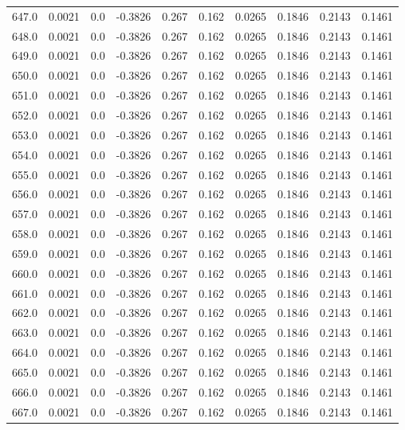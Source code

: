 \begin{longtable}{lrrrrrrrrr}
647.0 & 0.0021 & 0.0 & -0.3826 & 0.267 & 0.162 & 0.0265 & 0.1846 & 0.2143 & 0.1461 \\
648.0 & 0.0021 & 0.0 & -0.3826 & 0.267 & 0.162 & 0.0265 & 0.1846 & 0.2143 & 0.1461 \\
649.0 & 0.0021 & 0.0 & -0.3826 & 0.267 & 0.162 & 0.0265 & 0.1846 & 0.2143 & 0.1461 \\
650.0 & 0.0021 & 0.0 & -0.3826 & 0.267 & 0.162 & 0.0265 & 0.1846 & 0.2143 & 0.1461 \\
651.0 & 0.0021 & 0.0 & -0.3826 & 0.267 & 0.162 & 0.0265 & 0.1846 & 0.2143 & 0.1461 \\
652.0 & 0.0021 & 0.0 & -0.3826 & 0.267 & 0.162 & 0.0265 & 0.1846 & 0.2143 & 0.1461 \\
653.0 & 0.0021 & 0.0 & -0.3826 & 0.267 & 0.162 & 0.0265 & 0.1846 & 0.2143 & 0.1461 \\
654.0 & 0.0021 & 0.0 & -0.3826 & 0.267 & 0.162 & 0.0265 & 0.1846 & 0.2143 & 0.1461 \\
655.0 & 0.0021 & 0.0 & -0.3826 & 0.267 & 0.162 & 0.0265 & 0.1846 & 0.2143 & 0.1461 \\
656.0 & 0.0021 & 0.0 & -0.3826 & 0.267 & 0.162 & 0.0265 & 0.1846 & 0.2143 & 0.1461 \\
657.0 & 0.0021 & 0.0 & -0.3826 & 0.267 & 0.162 & 0.0265 & 0.1846 & 0.2143 & 0.1461 \\
658.0 & 0.0021 & 0.0 & -0.3826 & 0.267 & 0.162 & 0.0265 & 0.1846 & 0.2143 & 0.1461 \\
659.0 & 0.0021 & 0.0 & -0.3826 & 0.267 & 0.162 & 0.0265 & 0.1846 & 0.2143 & 0.1461 \\
660.0 & 0.0021 & 0.0 & -0.3826 & 0.267 & 0.162 & 0.0265 & 0.1846 & 0.2143 & 0.1461 \\
661.0 & 0.0021 & 0.0 & -0.3826 & 0.267 & 0.162 & 0.0265 & 0.1846 & 0.2143 & 0.1461 \\
662.0 & 0.0021 & 0.0 & -0.3826 & 0.267 & 0.162 & 0.0265 & 0.1846 & 0.2143 & 0.1461 \\
663.0 & 0.0021 & 0.0 & -0.3826 & 0.267 & 0.162 & 0.0265 & 0.1846 & 0.2143 & 0.1461 \\
664.0 & 0.0021 & 0.0 & -0.3826 & 0.267 & 0.162 & 0.0265 & 0.1846 & 0.2143 & 0.1461 \\
665.0 & 0.0021 & 0.0 & -0.3826 & 0.267 & 0.162 & 0.0265 & 0.1846 & 0.2143 & 0.1461 \\
666.0 & 0.0021 & 0.0 & -0.3826 & 0.267 & 0.162 & 0.0265 & 0.1846 & 0.2143 & 0.1461 \\
667.0 & 0.0021 & 0.0 & -0.3826 & 0.267 & 0.162 & 0.0265 & 0.1846 & 0.2143 & 0.1461 \\

\end{longtable}
